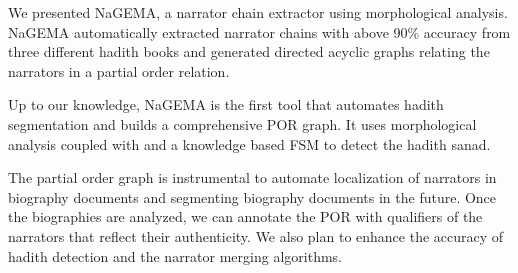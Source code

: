 \documentclass[11pt]{article}
\begin{document}
We presented NaGEMA, a narrator chain extractor
using morphological analysis. 
NaGEMA automatically extracted narrator chains with 
above 90\% accuracy
from three different hadith books and generated 
directed acyclic graphs relating the narrators 
in a partial order relation. 

Up to our knowledge, NaGEMA is the first 
tool that automates hadith segmentation and builds
a comprehensive POR graph.
It uses morphological analysis coupled with 
and a knowledge based FSM to  detect the hadith 
sanad. 

The partial order graph is instrumental to automate
localization of narrators in biography documents and
segmenting biography documents in the future.
Once the biographies are analyzed, we can annotate
the POR with qualifiers of the narrators that reflect
their authenticity. 
We also plan to 
enhance the accuracy of hadith detection and the 
narrator merging algorithms. 







\end{document}

